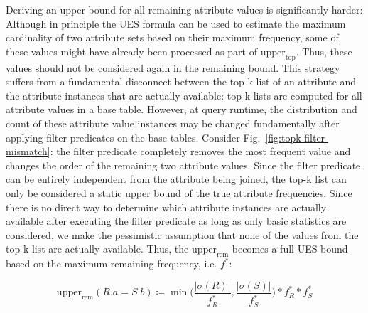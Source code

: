 Deriving an upper bound for all remaining attribute values is significantly harder: Although in principle the UES formula can be used to estimate the maximum cardinality of two attribute sets based on their maximum frequency, some of these values might have already been processed as part of $\text{upper}_\text{top}$. 
Thus, these values should not be considered again in the remaining bound. 
This strategy suffers from a fundamental disconnect between the top-k list of an attribute  and the attribute instances that are actually available: top-k lists are computed for all attribute values in a base table. 
However, at query runtime, the distribution and count of these attribute value instances may be changed fundamentally after applying filter predicates on the base tables. 
Consider Fig.~\ref{fig:topk-filter-mismatch}: the filter predicate completely removes the most frequent value and changes the order of the remaining two attribute values. 
Since the filter predicate can be entirely independent from the attribute being joined, the top-k list can only be considered a static upper bound of the true attribute frequencies.
Since there is no direct way to determine which attribute instances are actually available after executing the filter predicate as long as only basic statistics are considered, we make the pessimistic assumption that none of the values from the top-k list are actually available.
Thus, the $\text{upper}_\text{rem}$ becomes a full UES bound based on the maximum remaining frequency, i.e. $f^\ast$:

\begin{definition}
    \begin{equation}
        \text{upper}_\text{rem}(R.a = S.b) \coloneqq \min \biggl( \frac{|\sigma(R)|}{f^\ast_R}, \frac{|\sigma(S)|}{f^\ast_S} \biggr) * f^\ast_R * f^\ast_S
    \end{equation}
    \label{def:approx-bound-remainder}
\end{definition}


